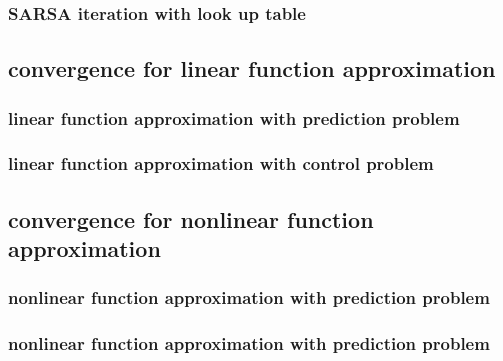 \documentclass[10pt,a4paper]{article}
\theoremstyle{definition}
\theoremstyle{remark}
\begin{document}
		\subsubsection{SARSA iteration with look up table}
		
		
	
	
	\subsection{convergence for linear function approximation}
	
		\subsubsection{linear function approximation with prediction problem}
		
		\subsubsection{linear function approximation with control problem}
	
	\subsection{convergence for nonlinear function approximation}	
		\subsubsection{nonlinear function approximation with prediction problem}
		
		\subsubsection{nonlinear function approximation with prediction problem}
	
	
		
		
	
	
\end{document}
